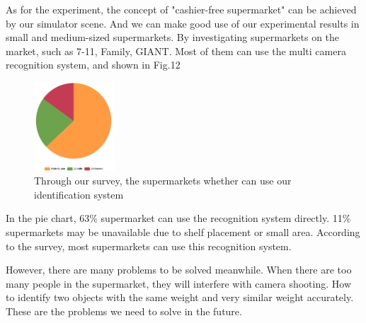 As for the experiment, the concept of "cashier-free supermarket" can be achieved by our simulator scene.
And we can make good use of our experimental results in small and medium-sized supermarkets.
By investigating supermarkets on the market, such as 7-11, Family, GIANT.
Most of them can use the multi camera recognition system, and shown in Fig.12

\begin{figure}[htbp]
\centerline{\includegraphics[width=3cm,scale=0.3]{pie.jpg}}
\caption{Through our survey, the supermarkets whether can use our identification system}
\label{fig}
\end{figure}

In the pie chart, 63\% supermarket can use the recognition system directly.
11\% supermarkets may be unavailable due to shelf placement or small area.
According to the survey, most supermarkets can use this recognition system.

However, there are many problems to be solved meanwhile.
When there are too many people in the supermarket, they will interfere with camera shooting.
How to identify two objects with the same weight and very similar weight accurately.
These are the problems we need to solve in the future.
